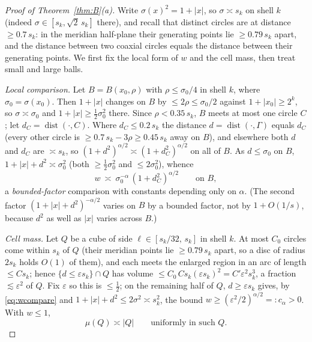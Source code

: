 \documentclass[11pt]{amsart}
\newcommand{\abs}[1]{\lvert #1\rvert}
\DeclareMathOperator{\dist}{dist}
\theoremstyle{plain}
\theoremstyle{definition}
\theoremstyle{remark}
\begin{document}
\begin{proof}[Proof of Theorem~\ref{thm:B}(a)]
Write $\sigma(x)^2=1+\abs x$, so $\sigma\asymp s_k$ on shell $k$ (indeed
$\sigma\in[s_k,\sqrt2\,s_k]$ there), and recall that distinct circles are at
distance $\ge0.7\,s_k$: in the meridian half-plane their generating points lie
$\ge0.79\,s_k$ apart, and the distance between two coaxial circles equals the
distance between their generating points. We first fix the local form of $w$
and the cell mass, then treat small and large balls.

\emph{Local comparison.} Let $B=B(x_0,\rho)$ with $\rho\le\sigma_0/4$ in shell
$k$, where $\sigma_0=\sigma(x_0)$. Then $1+\abs x$ changes on $B$ by $\le2\rho\le
\sigma_0/2$ against $1+\abs{x_0}\ge2^k$, so $\sigma\asymp\sigma_0$ and
$1+\abs x\ge\tfrac12\sigma_0^2$ there. Since $\rho<0.35\,s_k$, $B$ meets at most
one circle $C$; let $d_C=\dist(\cdot,C)$. Where $d_C\le0.2\,s_k$ the distance
$d=\dist(\cdot,\Gamma)$ equals $d_C$ (every other circle is $\ge0.7\,s_k-3\rho\ge
0.45\,s_k$ away on $B$), and elsewhere both $d$ and $d_C$ are $\asymp s_k$, so
$(1+d^2)^{\alpha/2}\asymp(1+d_C^2)^{\alpha/2}$ on all of $B$. As $d\le\sigma_0$ on
$B$, $1+\abs x+d^2\asymp\sigma_0^2$ (both $\ge\tfrac12\sigma_0^2$ and
$\le2\sigma_0^2$), whence
\begin{equation}\label{eq:wcompare}
w\ \asymp\ \sigma_0^{-\alpha}\,(1+d_C^2)^{\alpha/2}\qquad\text{on }B,
\end{equation}
a \emph{bounded-factor} comparison with constants depending only on $\alpha$.
(The second factor $(1+\abs x+d^2)^{-\alpha/2}$ varies on $B$ by a bounded
factor, not by $1+O(1/s)$, because $d^2$ as well as $\abs x$ varies across $B$.)

\emph{Cell mass.} Let $Q$ be a cube of side $\ell\in[s_k/32,\,s_k]$ in shell $k$.
At most $C_0$ circles come within $s_k$ of $Q$ (their meridian points lie
$\ge0.79\,s_k$ apart, so a disc of radius $2s_k$ holds $O(1)$ of them), and each
meets the enlarged region in an arc of length $\le Cs_k$; hence
$\{d\le\varepsilon s_k\}\cap Q$ has volume $\le C_0\,Cs_k(\varepsilon s_k)^2=
C'\varepsilon^2 s_k^3$, a fraction $\lesssim\varepsilon^2$ of $Q$. Fix
$\varepsilon$ so this is $\le\tfrac12$; on the remaining half of $Q$,
$d\ge\varepsilon s_k$ gives, by \eqref{eq:wcompare} and $1+\abs x+d^2\le
2\sigma^2\asymp s_k^2$, the bound $w\ge(\varepsilon^2/2)^{\alpha/2}=:c_\alpha>0$.
With $w\le1$,
\begin{equation}\label{eq:cellmass}
\mu(Q)\asymp\abs Q\qquad\text{uniformly in such }Q.
\end{equation}


\end{proof}
\end{document}

